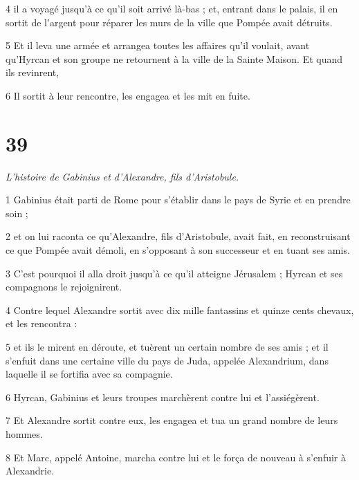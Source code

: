 \par 4 il a voyagé jusqu'à ce qu'il soit arrivé là-bas ; et, entrant dans le palais, il en sortit de l'argent pour réparer les murs de la ville que Pompée avait détruits.

\par 5 Et il leva une armée et arrangea toutes les affaires qu'il voulait, avant qu'Hyrcan et son groupe ne retournent à la ville de la Sainte Maison. Et quand ils revinrent,

\par 6 Il sortit à leur rencontre, les engagea et les mit en fuite.


\chapter{39}

\par \textit{L'histoire de Gabinius et d'Alexandre, fils d'Aristobule.}

\par 1 Gabinius était parti de Rome pour s'établir dans le pays de Syrie et en prendre soin ;

\par 2 et on lui raconta ce qu'Alexandre, fils d'Aristobule, avait fait, en reconstruisant ce que Pompée avait démoli, en s'opposant à son successeur et en tuant ses amis.

\par 3 C'est pourquoi il alla droit jusqu'à ce qu'il atteigne Jérusalem ; Hyrcan et ses compagnons le rejoignirent.

\par 4 Contre lequel Alexandre sortit avec dix mille fantassins et quinze cents chevaux, et les rencontra :

\par 5 et ils le mirent en déroute, et tuèrent un certain nombre de ses amis ; et il s'enfuit dans une certaine ville du pays de Juda, appelée Alexandrium, dans laquelle il se fortifia avec sa compagnie.

\par 6 Hyrcan, Gabinius et leurs troupes marchèrent contre lui et l'assiégèrent.

\par 7 Et Alexandre sortit contre eux, les engagea et tua un grand nombre de leurs hommes.

\par 8 Et Marc, appelé Antoine, marcha contre lui et le força de nouveau à s'enfuir à Alexandrie.


